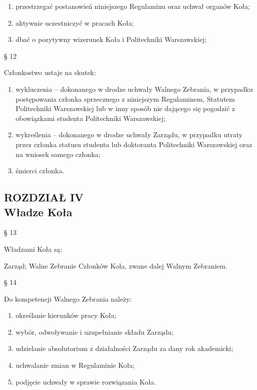 \documentclass[a4paper,11pt]{article}
\renewcommand{\paragraph}[1] {\begin{center}§ {#1}\end{center}}
\newcommand{\content}[1] {\begin{flushleft}{#1}\end{flushleft}}
\newcommand{\chapter}[2] {\begin{center}\section*{ROZDZIAŁ {#1} \\ {#2}}\end{center}}
\begin{document}
\begin{enumerate}
	\item przestrzegać postanowień niniejszego Regulaminu oraz uchwał organów Koła;
	\item aktywnie uczestniczyć w pracach Koła;
	\item dbać o pozytywny wizerunek Koła i Politechniki Warszawskiej;
\end{enumerate}

\paragraph{12}
\content{Członkostwo ustaje na skutek:}
\begin{enumerate}
	\item wykluczenia  –  dokonanego  w  drodze  uchwały  Walnego  Zebrania,  w  przypadku
postępowania  członka  sprzecznego  z  niniejszym  Regulaminem,  Statutem  Politechniki
Warszawskiej  lub w  inny sposób nie  dającego się  pogodzić z  obowiązkami  studenta
Politechniki Warszawskiej;
	\item wykreślenia – dokonanego w drodze uchwały Zarządu, w przypadku utraty przez członka
statusu  studenta  lub  doktoranta  Politechniki  Warszawskiej  oraz  na  wniosek  samego
członka;
	\item śmierci członka.
\end{enumerate}

\chapter{IV}{Władze Koła}

\paragraph{13}
\content{Władzami Koła są:}

	Zarząd;
	Walne Zebranie Członków Koła, zwane dalej Walnym Zebraniem.

\paragraph{14}
\content{Do kompetencji Walnego Zebrania należy:}
\begin{enumerate}
	\item określanie kierunków pracy Koła;
	\item wybór, odwoływanie i uzupełnianie składu Zarządu;
	\item udzielanie absolutorium z działalności Zarządu za dany rok akademicki;
	\item uchwalanie zmian w Regulaminie Koła;
	\item podjęcie uchwały w sprawie rozwiązania Koła.
\end{enumerate}
\end{document}
